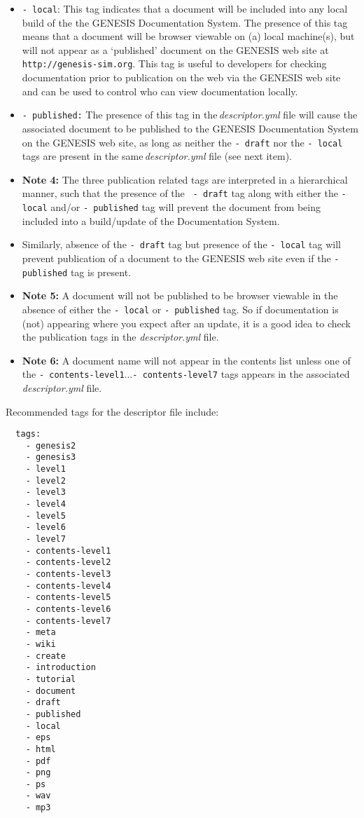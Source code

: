\documentclass[12pt]{article}
\begin{document}
\begin{enumerate}
\begin{enumerate}
\begin{itemize}
	\item[]{\tt -\,local}: This tag indicates that a document will be included into any local build of the the GENESIS Documentation 
	System. The presence of this tag means that a document will be browser viewable on (a) local machine(s), but will not appear as a `published' 
	document on the GENESIS web site at {\tt http://genesis-sim.org}. This tag is useful to developers for checking documentation prior to publication on the web via the GENESIS web site and can be used to control who can view documentation locally.
	
	\item[]{\tt -\,published:} The presence of this tag in the\,{\it descriptor.yml} file will cause the associated document to be published to the GENESIS Documentation System on the GENESIS web site, as long as neither the {\tt -\,draft} nor the {\tt -\,local} tags are present in the same\,{\it descriptor.yml} file (see next item).
	
	\item[]{\bf Note 4:} The three publication related tags are interpreted in a hierarchical manner, such that the presence of the {\tt 
	-\,draft} tag along with either the {\tt -\,local} and/or {\tt -\,published} tag will prevent the document from being included into a 
	build/update of the Documentation System.
		
	\item[]Similarly, absence of the {\tt -\,draft} tag but presence of the {\tt -\,local} tag will prevent publication of a document to the 
	GENESIS web site even if the {\tt -\,published} tag is present.
	
	\item[] {\bf Note 5:} A document will not be published to be browser viewable in the absence of either the {\tt -\,local} or {\tt -\,published} tag. So if documentation is (not) appearing where you expect after an update, it is a good idea to check the 
	publication tags in the {\it descriptor.yml} file.
	\item[] {\bf Note 6:} A document name will not appear in the contents list unless one of the {\tt -\,contents-level1}$\ldots${\tt -\,contents-level7} tags appears in the associated {\it descriptor.yml} file.
\end{itemize}

Recommended tags for the descriptor file include:
\begin{verbatim}
  tags:
    - genesis2
    - genesis3
    - level1
    - level2
    - level3
    - level4
    - level5
    - level6
    - level7
    - contents-level1
    - contents-level2
    - contents-level3
    - contents-level4
    - contents-level5
    - contents-level6
    - contents-level7
    - meta
    - wiki
    - create
    - introduction
    - tutorial
    - document
    - draft
    - published
    - local
    - eps
    - html
    - pdf
    - png
    - ps
    - wav
    - mp3
    

\end{verbatim}
\end{enumerate}
\end{enumerate}
\end{document}

